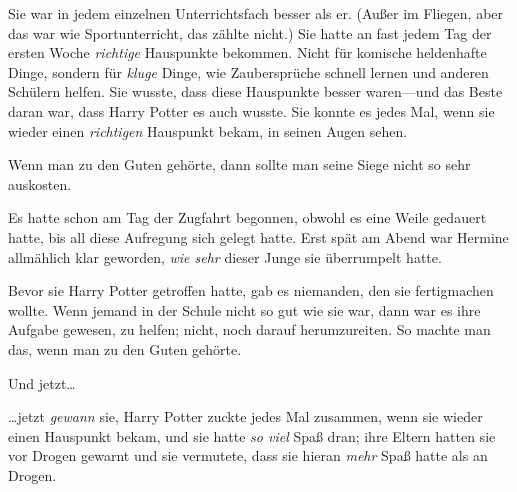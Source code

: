 Sie war in jedem einzelnen Unterrichtsfach besser als er. (Außer im Fliegen, aber das war wie Sportunterricht, das zählte nicht.) Sie hatte an fast jedem Tag der ersten Woche \emph{richtige} Hauspunkte bekommen. Nicht für komische heldenhafte Dinge, sondern für \emph{kluge} Dinge, wie Zaubersprüche schnell lernen und anderen Schülern helfen. Sie wusste, dass diese Hauspunkte besser waren—und das Beste daran war, dass Harry Potter es auch wusste. Sie konnte es jedes Mal, wenn sie wieder einen \emph{richtigen} Hauspunkt bekam, in seinen Augen sehen.

Wenn man zu den Guten gehörte, dann sollte man seine Siege nicht so sehr auskosten.

Es hatte schon am Tag der Zugfahrt begonnen, obwohl es eine Weile gedauert hatte, bis all diese Aufregung sich gelegt hatte. Erst spät am Abend war Hermine allmählich klar geworden, \emph{wie sehr} dieser Junge sie überrumpelt hatte.

Bevor sie Harry Potter getroffen hatte, gab es niemanden, den sie fertigmachen wollte. Wenn jemand in der Schule nicht so gut wie sie war, dann war es ihre Aufgabe gewesen, zu helfen; nicht, noch darauf herumzureiten. So machte man das, wenn man zu den Guten gehörte.

Und jetzt…

…jetzt \emph{gewann} sie, Harry Potter zuckte jedes Mal zusammen, wenn sie wieder einen Hauspunkt bekam, und sie hatte \emph{so viel} Spaß dran; ihre Eltern hatten sie vor Drogen gewarnt und sie vermutete, dass sie hieran \emph{mehr} Spaß hatte als an Drogen.

